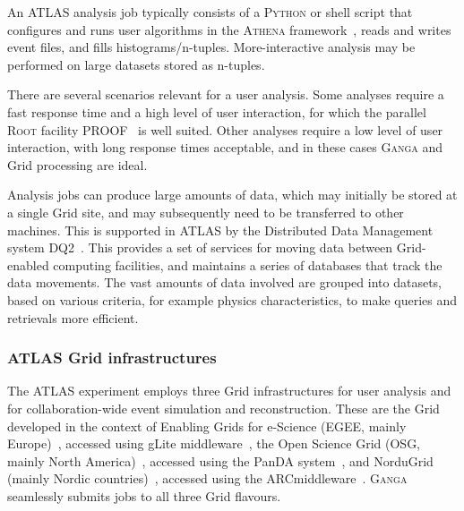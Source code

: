 \documentclass{elsart}
\def\atlas {ATLAS\xspace}
\def\ganga {\textsc{Ganga}\xspace}
\def\python {\textsc{Python}\xspace}
\def\root {\textsc{Root}\xspace}
\def\athena {\textsc{Athena}\xspace}
\def\grid {Grid\xspace}
\def\ARC{ARC}
\begin{document}
An \atlas analysis job typically consists of a \python
or shell script that configures and runs user algorithms in the \athena
framework~\cite{bib:atlascompmod}, reads and writes event files, and
fills histograms/n-tuples. More-interactive analysis may be performed on
large datasets stored as n-tuples.

There are several scenarios relevant for a user analysis.  Some analyses require
a fast response time and a high level of user interaction, for which the
parallel \root facility PROOF~\cite{ballintijn_2006} is well suited.  Other
analyses require a low level of user interaction, with long response times
acceptable, and in these cases \ganga and \grid processing are ideal.

Analysis jobs can produce large amounts of data, which may initially be
stored at a single \grid site, and may subsequently need to be transferred
to other machines.  This is supported in \atlas by the Distributed Data
Management system DQ2~\cite{bib:atlasdq2}.  This provides
a set of services for moving data between \grid-enabled computing facilities,
and maintains a series of databases that track the data movements.  The
vast amounts of data involved are grouped into datasets, based on various
criteria, for example physics characteristics, to make queries and retrievals
more efficient.

\subsubsection{\atlas \grid infrastructures}

The \atlas experiment employs three \grid infrastructures for user
analysis and for collaboration-wide event simulation and reconstruction. These
are the \grid developed in the context of Enabling  Grids for e-Science
(EGEE, mainly Europe)~\cite{jones_2005}, accessed using gLite
middleware~\cite{andreetto_2008}, the Open Science Grid (OSG, mainly North
America)~\cite{OSG}, accessed using the PanDA system~\cite{maeno_2008}, and
NorduGrid (mainly Nordic countries)~\cite{ellert_2003}, accessed using the
\ARC middleware~\cite{ellert_2007}.  \ganga seamlessly submits jobs to all
three \grid flavours.
\end{document}
